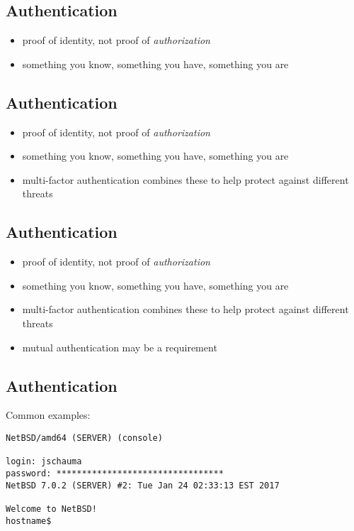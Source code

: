 \documentclass[xga]{xdvislides}
\begin{document}
\subsection{Authentication}

\begin{itemize}
	\item proof of identity, not proof of {\em authorization}
	\item something you know, something you have, something you are
\end{itemize}

\subsection{Authentication}

\begin{itemize}
	\item proof of identity, not proof of {\em authorization}
	\item something you know, something you have, something you are
	\item multi-factor authentication combines these to help protect against different threats
\end{itemize}

\subsection{Authentication}

\begin{itemize}
	\item proof of identity, not proof of {\em authorization}
	\item something you know, something you have, something you are
	\item multi-factor authentication combines these to help protect against different threats
	\item mutual authentication may be a requirement
\end{itemize}

\subsection{Authentication}
Common examples:

\begin{verbatim}
NetBSD/amd64 (SERVER) (console)

login: jschauma
password: *********************************
NetBSD 7.0.2 (SERVER) #2: Tue Jan 24 02:33:13 EST 2017

Welcome to NetBSD!
hostname$ 
\end{verbatim}
\end{document}

